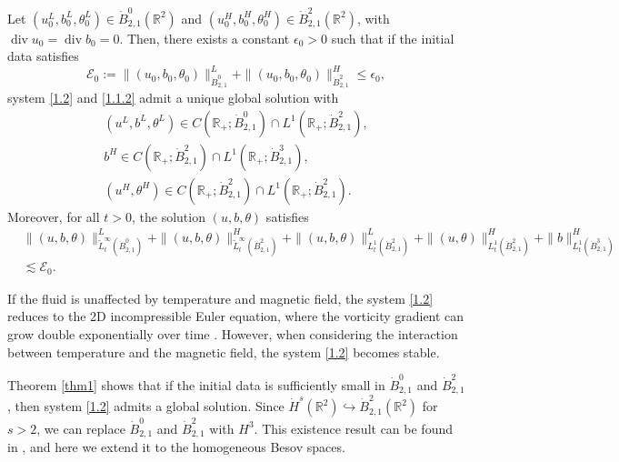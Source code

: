 \documentclass[reqno]{amsart}
\begin{document}
\begin{theorem} \label{thm1}
Let $(u_0^L, b_0^L, \theta_0^L)\in \dot{B}^0_{2,1}(\mathbb{R}^2)$ and
$(u_0^H, b_0^H, \theta_0^H)\in \dot{B}^2_{2,1}(\mathbb{R}^2)$, with
$\operatorname{div} u_0=\operatorname{div} b_0=0$. Then, there exists a
 constant $\epsilon_0>0$ such that if the initial data satisfies
\begin{equation} \label{1.4}
 \mathcal{E}_0:=\|(u_0,b_0,\theta_0)\|_{\dot{B}^0_{2,1}}^L+\|(u_0,b_0,\theta_0)\|_{\dot{B}^2_{2,1}}^H\leqslant\epsilon_0,
\end{equation}
 system \eqref{1.2} and \eqref{1.1.2} admit a unique global solution with
\begin{equation} \label{1.5}
\begin{gathered}
(u^L,b^L,\theta^L)\in C(\mathbb{R}_+;\dot{B}^0_{2,1})\cap L^1(\mathbb{R}_+;\dot{B}^2_{2,1}),\\
 b^H\in C(\mathbb{R}_+;\dot{B}^2_{2,1})\cap L^1(\mathbb{R}_+;\dot{B}^3_{2,1}), \\
(u^H,\theta^H)\in C(\mathbb{R}_+;\dot{B}^2_{2,1})\cap L^1(\mathbb{R}_+;\dot{B}^2_{2,1}).
\end{gathered}
\end{equation}
Moreover, for all $t > 0$, the solution $(u, b, \theta)$ satisfies
\begin{equation}\label{1.3}
\begin{aligned}
&\|(u,b,\theta)\|_{\tilde{L}^\infty_t(\dot{B}^0_{2,1})}^L
 +\|(u,b,\theta)\|_{\tilde{L}^\infty_t(\dot{B}^2_{2,1})}^H
  +\|(u,b,\theta)\|_{{L}^1_t(\dot{B}^2_{2,1})}^L
 +\|(u,\theta)\|_{{L}^1_t(\dot{B}^2_{2,1})}^H+\|b\|_{{L}^1_t(\dot{B}^3_{2,1})}^H\\
&\lesssim\mathcal{E}_0.
\end{aligned}
\end{equation}
\end{theorem}

\begin{remark} \rm
If the fluid is unaffected by temperature and magnetic field, the system \eqref{1.2} reduces to the
2D incompressible Euler equation, where the vorticity gradient can grow double exponentially over
time \cite{MR3293735,MR3245016,MR3475939}.
However, when considering the interaction between temperature and the magnetic field, the system \eqref{1.2} becomes stable.
\end{remark}


\begin{remark} \rm
Theorem \ref{thm1} shows that if the initial data is sufficiently small in $\dot{B}^0_{2,1}$ and
$\dot{B}^2_{2,1}$, then system \eqref{1.2} admits a global solution.
Since $\dot{H}^s(\mathbb{R}^2)\hookrightarrow\dot{B}^2_{2,1}(\mathbb{R}^2)$ for $s>2$,
we can replace $\dot{B}^0_{2,1}$ and $\dot{B}^2_{2,1}$ with $H^3$.
This existence result can be found in \cite{MR4790886}, and here we extend it to the homogeneous
Besov spaces.
\end{remark}
\end{document}
